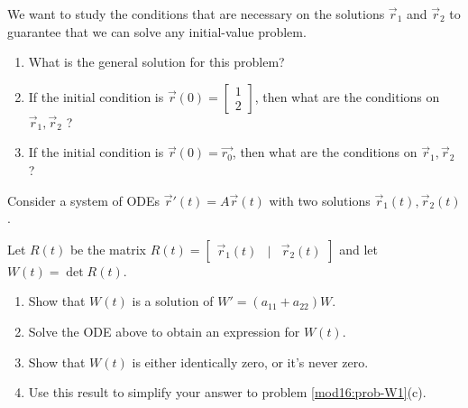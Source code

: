 \begin{exercises}
\begin{problist}
		We want to study the conditions that are necessary on the solutions $\vec{r}_1$ and $\vec{r}_2$ to guarantee that we can solve any initial-value problem.
		
		\begin{enumerate}
			\item What is the general solution for this problem?
			\item If the initial condition is $\vec{r}(0)= \begin{bmatrix} 1 \\ 2 \end{bmatrix}$, then what are the conditions on $\vec{r}_1,\vec{r}_2$ ?
			\item If the initial condition is $\vec{r}(0)= \vec{r_0}$, then what are the conditions on $\vec{r}_1,\vec{r}_2$ ?
		\end{enumerate}

		\prob Consider a system of ODEs $\vec{r}'(t) = A \vec{r}(t)$ with two solutions $\vec{r}_1(t), \vec{r}_2(t)$.
		
			Let $R(t)$ be the matrix 
				$R(t) = \begin{bmatrix} \vec{r}_1(t) & | & \vec{r}_2(t)	\end{bmatrix} $ 
				and let $W(t) = \det R(t)$.
		
		\begin{enumerate}
			\item Show that $W(t)$ is a solution of $W' = (a_{11} + a_{22}) W$.
			\item Solve the ODE above to obtain an expression for $W(t)$.
			\item Show that $W(t)$ is either identically zero, or it's never zero. 
			\item Use this result to simplify your answer to problem \ref{mod16:prob-W1}(c).
		\end{enumerate}
	
	\end{problist}
\end{exercises}
